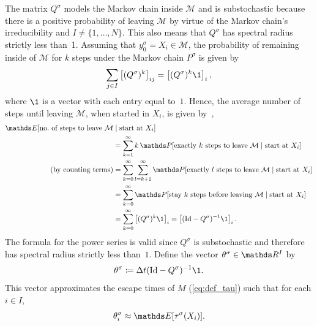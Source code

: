 The matrix $Q^\sigma$ models the Markov chain inside $\mathcal{M}$ and is substochastic because there is a positive probability of leaving $\mathcal{M}$ by virtue of the Markov chain's irreducibility and $I \neq \{1,\ldots,N\}$. This also means that $Q^\sigma$ has spectral radius strictly less than~1. Assuming that $y_0^\sigma = X_i \in \mathcal{M}$, the probability of remaining inside of $\mathcal{M}$ for $k$ steps under the Markov chain $P^\sigma$ is given by
\begin{equation}
    \sum_{j\in I}\left[(Q^\sigma)^k\right]_{ij} = \left[(Q^\sigma)^k\1 \right]_i,
\end{equation}
where $\1$ is a vector with each entry equal to~$1$. Hence, the average number of steps until leaving $\mathcal{M}$, when started in $X_i$, is given by~\parencite[Theorem 1.3.5]{norrisMarkovChains1997},
\begin{align*}
    \E[\text{no.\ of steps to leave $\mathcal{M}$} & \mid \text{start at }X_i]                                                                                                \\
                                                   & = \sum_{k=1}^{\infty} k\, \P[\text{exactly $k$ steps to leave $\mathcal{M}$} \mid \text{start at }X_i]                   \\
    \text{(by counting terms)}                     & = \sum_{k=0}^{\infty} \sum_{l=k+1}^{\infty} \P[\text{exactly $l$ steps to leave $\mathcal{M}$} \mid \text{start at }X_i] \\
                                                   & = \sum_{k=0}^{\infty} \P[\text{stay $k$ steps before leaving $\mathcal{M}$} \mid \text{start at }X_i]                    \\
                                                   & = \sum_{k=0}^\infty \left[(Q^\sigma)^k\1 \right]_i = \left[ (\Id- Q^\sigma)^{-1} \1 \right]_i.
\end{align*}
The formula for the power series
is valid since $Q^\sigma$ is substochastic and therefore has spectral radius strictly less than~$1$. Define the vector $\theta^\sigma \in \R^{I}$ by
\begin{equation}\label{eq:def_theta}
    \theta^\sigma \coloneqq \Delta t (\Id - Q^\sigma)^{-1}\1.
\end{equation}
This vector approximates the escape times of $M$ (\cref{eq:def_tau})
such that for each $i\in I$,
\begin{equation}
    \theta^\sigma_i \approx \E[\tau^\sigma(X_i)].
\end{equation}

